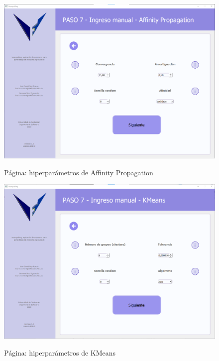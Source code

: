 \begin{figure}[H]
    \centering
    \caption{Página: hiperparámetros de Affinity Propagation}
    \includegraphics[width=\textwidth]{images/affinitypropagation.png}
    \label{fig:affinitypropagation}
\end{figure}

\begin{figure}[H]
    \centering
    \caption{Página: hiperparámetros de KMeans}
    \includegraphics[width=\textwidth]{images/kmeans.png}
    \label{fig:kmeans}
\end{figure}

